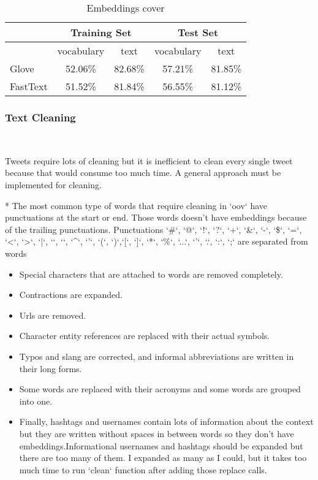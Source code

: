 \begin{table}[htbp]
	\centering
	\caption{Embeddings cover}
	\begin{tabular}{lcccc}
		\toprule
		& \multicolumn{2}{c}{Training Set} & \multicolumn{2}{c}{Test Set} \\
		\midrule
		& vocabulary & text  & vocabulary & text \\
		\midrule
		Glove & 52.06\% & 82.68\% & 57.21\% & 81.85\% \\
		FastText & 51.52\% & 81.84\% & 56.55\% & 81.12\% \\
		\bottomrule
	\end{tabular}%
	\label{tab:Embeddings-cover}%
\end{table}%
	
	
\subsubsection{Text Cleaning}
\
 
Tweets require lots of cleaning but it is inefficient to 
clean every single tweet because that would consume too 
much time. A general approach must be implemented for cleaning.

* The most common type of words that require cleaning in `oov` 
have punctuations at the start or end. Those words doesn't have 
embeddings because of the trailing punctuations. Punctuations `\#`, 
`@`, `!`, `?`, `+`, `\&`, `-`, `\$`, `=`, `<`, `>`, `|`, `{`, `}`, 
`^`, `'`, `(`, `)`,`[`, `]`, `*`, `\%`, `...`, `'`, `.`, `:`, `;` 
are separated from words

\begin{itemize}
	\item
	Special characters that are attached to words are removed completely.
	\item
	Contractions are expanded.
	\item
	Urls are removed.
	\item
	Character entity references are replaced with their actual symbols.
	\item
	Typos and slang are corrected, and informal abbreviations are written in their long forms.
	\item
	Some words are replaced with their acronyms and some words are grouped into one.
	\item
	Finally, hashtags and usernames contain lots of information about the context but they 
	are written without spaces in between words so they don't have embeddings.Informational 
	usernames and hashtags should be expanded but there are too many of them. 
	I expanded as many as I could, but it takes too much time to run `clean` 
	function after adding those replace calls.
\end{itemize}

